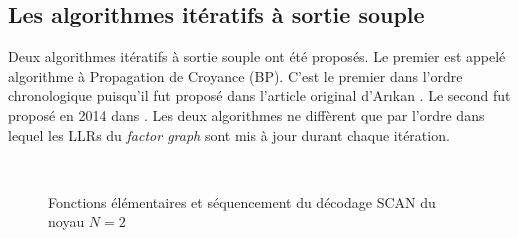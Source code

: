\subsection{Les algorithmes itératifs à sortie souple}
\label{subsec:soft_algo}

Deux algorithmes itératifs à sortie souple ont été proposés. Le premier est appelé algorithme à Propagation de Croyance (BP). C'est le premier dans l'ordre chronologique puisqu'il fut proposé dans l'article original d'Ar{\i}kan \cite{arikan_channel_2009}. Le second fut proposé en 2014 dans \cite{fayyaz_low-complexity_2014}. Les deux algorithmes ne diffèrent que par l'ordre dans lequel les LLRs du \textit{factor graph} sont mis à jour durant chaque itération.

\begin{figure}[t]
  \renewcommand*\thesubfigure{\arabic{subfigure}} 
  \centering
  \hspace{2.5cm}
  \\
  \hspace{0.5cm}
  \hspace{3.7cm}
  \caption{Fonctions élémentaires et séquencement du décodage SCAN du noyau $N=2$}
  \label{fig:SCANSchedule}
\end{figure}
